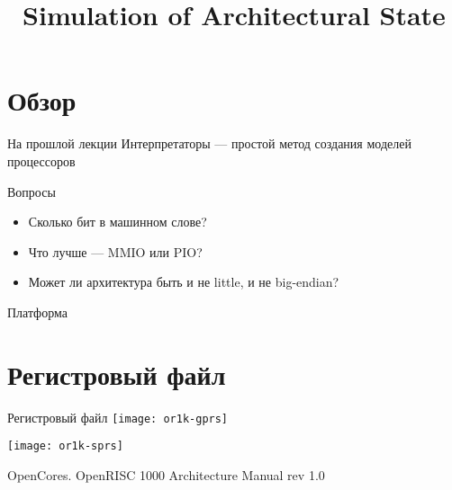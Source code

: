 

\title{Simulation of Architectural State}



\begin{frame}
    \maketitle
\end{frame}

\begin{frame}
    \tableofcontents
\end{frame}

\section*{Обзор}

\begin{frame}{На прошлой лекции}
Интерпретаторы — простой метод создания моделей процессоров

\end{frame}

\begin{frame}{Вопросы}
\begin{itemize}
\item Сколько бит в машинном слове? \pause
\item Что лучше — MMIO или PIO?\pause
\item Может ли архитектура быть и не little, и не big-endian?
\end{itemize}
\end{frame}


\begin{frame}{Платформа}
\centering
\vfill
{}
\vfill

\end{frame}

\section{Регистровый файл}

\begin{frame}{Регистровый файл}
\centering
\texttt{[image: or1k-gprs]}

\texttt{[image: or1k-sprs]}

\tiny{OpenCores. OpenRISC 1000 Architecture Manual rev 1.0}
\end{frame}

